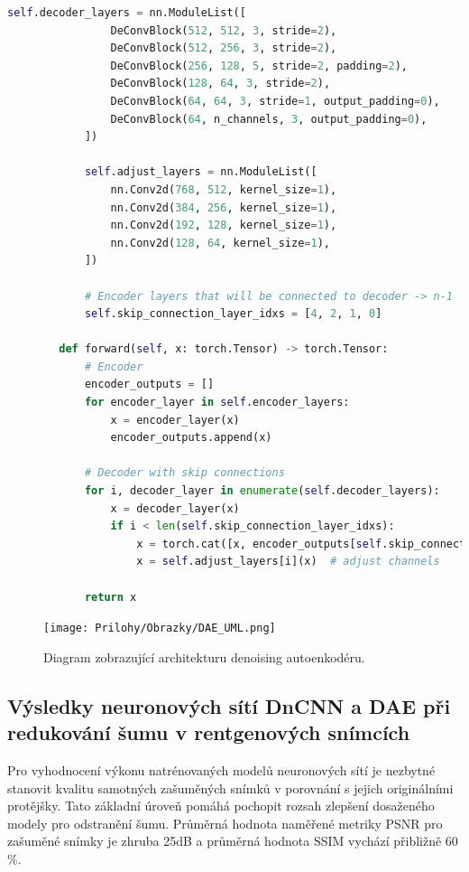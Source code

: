 \documentclass[male,czech,api_ing]{thesis}
\begin{document}
\begin{lstlisting}[language=Python, caption={Implementace autoenkodéru pro redukci šumu}, label={lst:DAEClass}]
            self.decoder_layers = nn.ModuleList([
                DeConvBlock(512, 512, 3, stride=2),
                DeConvBlock(512, 256, 3, stride=2),
                DeConvBlock(256, 128, 5, stride=2, padding=2),
                DeConvBlock(128, 64, 3, stride=2),
                DeConvBlock(64, 64, 3, stride=1, output_padding=0),
                DeConvBlock(64, n_channels, 3, output_padding=0),
            ])
            
            self.adjust_layers = nn.ModuleList([
                nn.Conv2d(768, 512, kernel_size=1),
                nn.Conv2d(384, 256, kernel_size=1),
                nn.Conv2d(192, 128, kernel_size=1),
                nn.Conv2d(128, 64, kernel_size=1),
            ])

            # Encoder layers that will be connected to decoder -> n-1
            self.skip_connection_layer_idxs = [4, 2, 1, 0]

        def forward(self, x: torch.Tensor) -> torch.Tensor:
            # Encoder
            encoder_outputs = []
            for encoder_layer in self.encoder_layers:
                x = encoder_layer(x)
                encoder_outputs.append(x)
            
            # Decoder with skip connections
            for i, decoder_layer in enumerate(self.decoder_layers):
                x = decoder_layer(x)
                if i < len(self.skip_connection_layer_idxs):
                    x = torch.cat([x, encoder_outputs[self.skip_connection_layer_idxs[i]]], dim=1)  # skip connections
                    x = self.adjust_layers[i](x)  # adjust channels
            
            return x
\end{lstlisting}

\begin{figure}[h]
    \centering
    \texttt{[image: Prilohy/Obrazky/DAE\_UML.png]}
    \caption{Diagram zobrazující architekturu denoising autoenkodéru.}
    \label{fig:DAE}
\end{figure}

\subsection{Výsledky neuronových sítí DnCNN a DAE při redukování šumu v rentgenových snímcích}
Pro vyhodnocení výkonu natrénovaných modelů neuronových sítí je nezbytné stanovit kvalitu samotných zašuměných snímků v porovnání s jejich originálními protějšky. Tato základní úroveň pomáhá pochopit rozsah zlepšení dosaženého modely pro odstranění šumu. Průměrná hodnota naměřené metriky PSNR pro zašuměné snímky je zhruba 25dB a průměrná hodnota SSIM vychází přibližně 60 \%.
\end{document}

